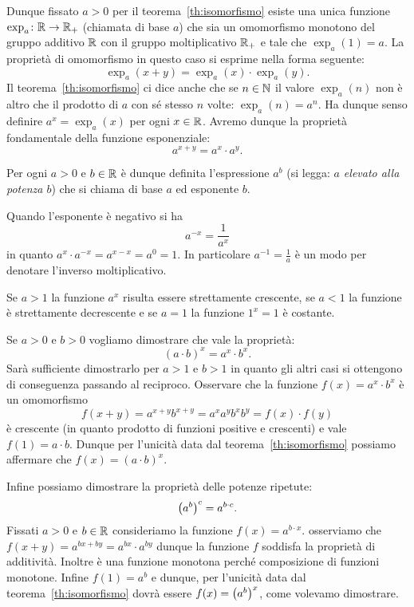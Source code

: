 Dunque fissato $a>0$ per il teorema~\ref{th:isomorfismo}
esiste una unica funzione $\exp_a\colon {\mathbb R} \to {\mathbb R}_+$ 
(chiamata  di base $a$)
che sia un omomorfismo monotono del gruppo additivo ${\mathbb R}$ con il gruppo
moltiplicativo ${\mathbb R}_+$ e tale che $\exp_a(1)=a$.
La proprietà di omomorfismo in questo caso 
si esprime nella forma seguente: 
\begin{equation}\label{eq:3589673}
  \exp_a(x+y) = \exp_a(x)\cdot \exp_a(y).
\end{equation}
Il teorema~\ref{th:isomorfismo}
ci dice anche che se $n\in {\mathbb N}$ il valore $\exp_a(n)$ 
non è altro che il prodotto di $a$ 
con sé stesso $n$ volte: $\exp_a(n) = a^n$. 
Ha dunque senso definire 
$a^x = \exp_a(x)$ per ogni $x\in {\mathbb R}$.
Avremo dunque la proprietà fondamentale della funzione 
esponenziale:
\[
  a^{x+y} = a^x\cdot a^y.
\]

Per ogni $a>0$ e $b\in {\mathbb R}$ è dunque definita l'espressione $a^b$
(si legga: \emph{$a$ elevato alla potenza $b$}) che si chiama 
 di base $a$ ed esponente $b$.

Quando l'esponente è negativo si ha 
\[
  a^{-x} = \frac{1}{a^x}  
\]
in quanto $a^x\cdot a^{-x} = a^{x-x} = a^0 = 1$.
In particolare $a^{-1} = \frac{1}{a}$ è un modo per denotare  
l'inverso moltiplicativo.

Se $a>1$ 
la funzione $a^x$ risulta essere strettamente crescente, 
se $a<1$ la funzione è strettamente decrescente 
e se $a=1$ la funzione $1^x=1$ è costante.

Se $a>0$ e $b>0$ vogliamo dimostrare che vale la proprietà:
\[
  (a\cdot b)^x = a^x\cdot b^x.
\]
Sarà sufficiente dimostrarlo per $a>1$ e $b>1$ in quanto gli 
altri casi si ottengono di conseguenza passando al reciproco.
Osservare che la funzione $f(x)=a^x\cdot b^x$ 
è un omomorfismo
\[
f(x+y) = a^{x+y}b^{x+y} = a^x a^y b^x b^y =  f(x)\cdot f(y)
\]
è crescente (in quanto prodotto di funzioni positive e crescenti)
e vale $f(1) = a\cdot b$. 
Dunque per l'unicità data dal teorema~\ref{th:isomorfismo}
possiamo affermare che $f(x)=(a\cdot b)^x$.

Infine possiamo dimostrare la proprietà delle potenze ripetute:
\[
  {\left( a^b \right)}^c = a^{b\cdot c}.
\]
Fissati $a>0$ e $b\in {\mathbb R}$ consideriamo la funzione $f(x) = a^{b\cdot x}$.
osserviamo che $f(x+y) = a^{bx+by}=a^{bx}\cdot a^{by}$ dunque 
la funzione $f$ soddisfa la proprietà di additività. 
Inoltre è una funzione monotona perché composizione di funzioni monotone.
Infine $f(1) = a^b$ e dunque, per l'unicità data dal teorema~\ref{th:isomorfismo}
dovrà essere $f(x) = {\left( a^b \right)}^x$, come volevamo dimostrare. 

